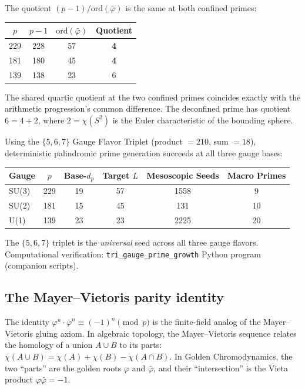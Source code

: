 \begin{result}
The quotient $(p - 1)/\mathrm{ord}(\bar\varphi)$ is the same at both confined primes:
\begin{center}
\begin{tabular}{@{}cccc@{}}
\toprule
$p$ & $p-1$ & $\mathrm{ord}(\bar\varphi)$ & Quotient \\
\midrule
229 & 228 & 57 & \textbf{4} \\
181 & 180 & 45 & \textbf{4} \\
139 & 138 & 23 & 6 \\
\bottomrule
\end{tabular}
\end{center}
The shared quartic quotient at the two confined primes coincides exactly with the arithmetic progression's common difference. The deconfined prime has quotient $6 = 4 + 2$, where $2 = \chi(S^2)$ is the Euler characteristic of the bounding sphere.
\end{result}

\begin{result}
\label{res:tri_gauge_primes}
Using the $\{5, 6, 7\}$ Gauge Flavor Triplet (product $= 210$, sum $= 18$), deterministic palindromic prime generation succeeds at all three gauge bases:
\begin{center}
\begin{tabular}{@{}lccccc@{}}
\toprule
Gauge & $p$ & Base-$d_p$ & Target $L$ & Mesoscopic Seeds & Macro Primes \\
\midrule
SU(3) & 229 & 19 & 57 & 1558 & 9 \\
SU(2) & 181 & 15 & 45 & 131 & 10 \\
U(1) & 139 & 23 & 23 & 2225 & 20 \\
\bottomrule
\end{tabular}
\end{center}
The $\{5, 6, 7\}$ triplet is the \emph{universal} seed across all three gauge flavors. Computational verification: \texttt{tri\_gauge\_prime\_growth} Python program (companion scripts).
\end{result}

\subsection{The Mayer--Vietoris parity identity}
\label{sec:mv_parity}

The identity $\varphi^n \cdot \bar\varphi^n \equiv (-1)^n \pmod{p}$
is the finite-field analog of the Mayer--Vietoris gluing axiom.
In algebraic topology, the Mayer--Vietoris sequence relates the
homology of a union $A \cup B$ to its parts:
$\chi(A \cup B) = \chi(A) + \chi(B) - \chi(A \cap B)$.
In Golden Chromodynamics, the two ``parts'' are the golden roots
$\varphi$ and $\bar\varphi$, and their ``intersection'' is the
Vieta product $\varphi \bar\varphi = -1$.

